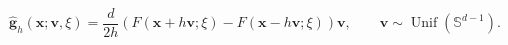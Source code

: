 \documentclass[12pt]{article}
\begin{document}
\[
 \widehat{\boldsymbol g}_{h}(\boldsymbol x;\boldsymbol v,\xi)
 =\frac{d}{2h}\left(
 F(\boldsymbol x+h\boldsymbol v;\xi)-F(\boldsymbol x-h\boldsymbol v;\xi)
 \right)\boldsymbol v,
 \qquad \boldsymbol v\sim\operatorname{Unif}(\mathbb S^{d-1}).
\]
\end{document}
